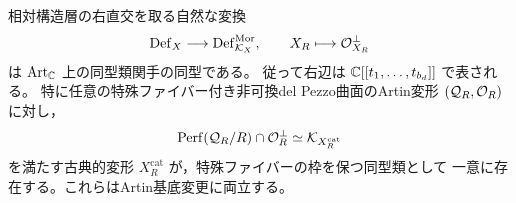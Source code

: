 \begin{theorem}[残余圏の形式的な古典的復元]
\label{thm:surface-ku-formal}
相対構造層の右直交を取る自然な変換
\begin{equation}\label{eq:surface-ku-formal-equivalence}
 \operatorname{Def}_X\longrightarrow\operatorname{Def}^{\mathrm{Mor}}_{\mathcal K_X},
 \qquad X_R\longmapsto\mathcal O_{X_R}^{\perp}
\end{equation}
は $\operatorname{Art}_{\mathbb C}$ 上の同型類関手の同型である。
従って右辺は $\mathbb C[[t_1,\ldots,t_{b_d}]]$ で表される。
特に任意の特殊ファイバー付き非可換del Pezzo曲面のArtin変形
$(\mathcal Q_R,\mathcal O_R)$ に対し，
\begin{equation}\label{eq:surface-ku-formal-companion}
 \operatorname{Perf}(\mathcal Q_R/R)\cap\mathcal O_R^\perp
 \simeq \mathcal K_{X_R^{\mathrm{cat}}}
\end{equation}
を満たす古典的変形 $X_R^{\mathrm{cat}}$ が，特殊ファイバーの枠を保つ同型類として
一意に存在する。これらはArtin基底変更に両立する。
\end{theorem}

